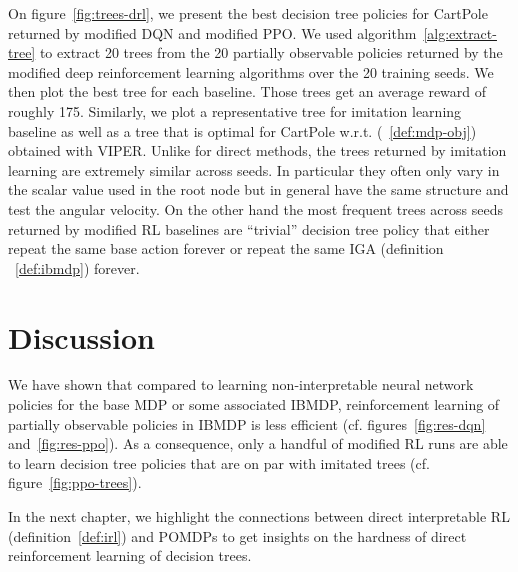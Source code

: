 On figure~\ref{fig:trees-drl}, we present the best decision tree policies for CartPole returned by modified DQN and modified PPO.
We used algorithm~\ref{alg:extract-tree} to extract 20 trees from the 20 partially observable policies returned by the modified deep reinforcement learning algorithms over the 20 training seeds.
We then plot the best tree for each baseline.
Those trees get an average reward of roughly 175.
Similarly, we plot a representative tree for imitation learning baseline as well as a tree that is optimal for CartPole w.r.t. (~\ref{def:mdp-obj}) obtained with VIPER. 
Unlike for direct methods, the trees returned by imitation learning are extremely similar across seeds. In particular they often only vary in the scalar value used in the root node but in general have the same structure and test the angular velocity.
On the other hand the most frequent trees across seeds returned by modified RL baselines are ``trivial'' decision tree policy that either repeat the same base action forever or repeat the same IGA (definition ~\ref{def:ibmdp}) forever.


\section{Discussion}
We have shown that compared to learning non-interpretable neural network policies for the base MDP or some associated IBMDP, reinforcement learning of partially observable policies in IBMDP is less efficient (cf. figures~\ref{fig:res-dqn} and~\ref{fig:res-ppo}). 
As a consequence, only a handful of modified RL runs are able to learn decision tree policies that are on par with imitated trees (cf. figure~\ref{fig:ppo-trees}).

In the next chapter, we highlight the connections between direct interpretable RL (definition~\ref{def:irl}) and POMDPs to get insights on the hardness of direct reinforcement learning of decision trees.